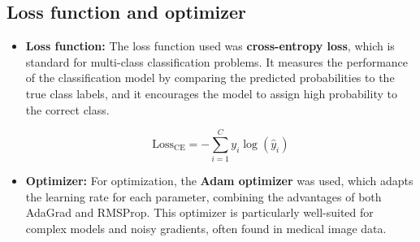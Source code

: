 
\subsection{Loss function and optimizer}

\begin{itemize}
    \item \textbf{Loss function:} The loss function used was \textbf{cross-entropy loss}, which is 
    standard for multi-class classification problems. It measures the performance of the 
    classification model by comparing the predicted probabilities to the true class labels, and it 
    encourages the model to assign high probability to the correct class.

    \begin{center}
    \[
    \text{Loss}_{\text{CE}} = - \sum_{i=1}^{C} y_i \log(\hat{y}_i)
    \]
    \end{center}

    \item \textbf{Optimizer:} For optimization, the \textbf{Adam optimizer} was used, which adapts 
    the learning rate for each parameter, combining the advantages of both AdaGrad and RMSProp. 
    This optimizer is particularly well-suited for complex models and noisy gradients, often found 
    in medical image data.
\end{itemize}
